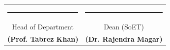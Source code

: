 \begin{tabular}{cc}
\hspace{0.4in}\noindent\rule{4cm}{0.5pt} & \hspace{1.8in}\noindent\rule{4cm}{0.5pt} \\
\hspace{0.4in}\small{Head of Department} & \hspace{1.8in}\small{Dean (SoET)} \\
\hspace{0.4in}\small{\textbf{(Prof. Tabrez Khan)}} & \hspace{1.8in}\small{\textbf{(Dr. Rajendra Magar)}} \\
\end{tabular}







